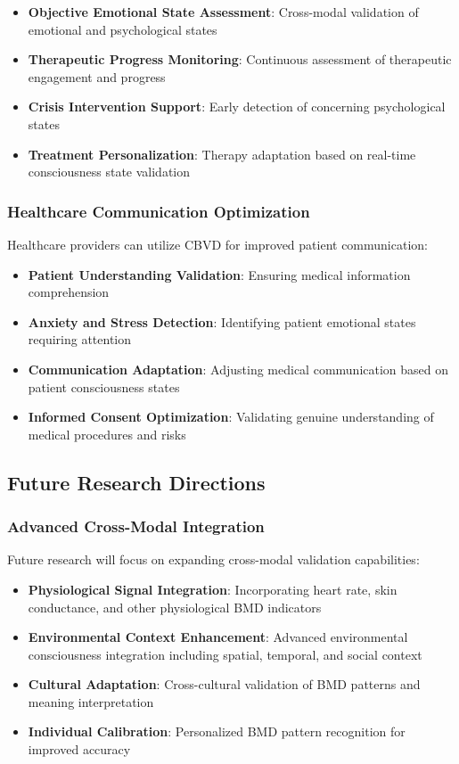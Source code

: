 \documentclass[12pt,a4paper]{article}
\begin{document}
\begin{itemize}
\item \textbf{Objective Emotional State Assessment}: Cross-modal validation of emotional and psychological states
\item \textbf{Therapeutic Progress Monitoring}: Continuous assessment of therapeutic engagement and progress
\item \textbf{Crisis Intervention Support}: Early detection of concerning psychological states
\item \textbf{Treatment Personalization}: Therapy adaptation based on real-time consciousness state validation
\end{itemize}

\subsubsection{Healthcare Communication Optimization}

Healthcare providers can utilize CBVD for improved patient communication:

\begin{itemize}
\item \textbf{Patient Understanding Validation}: Ensuring medical information comprehension
\item \textbf{Anxiety and Stress Detection}: Identifying patient emotional states requiring attention
\item \textbf{Communication Adaptation}: Adjusting medical communication based on patient consciousness states
\item \textbf{Informed Consent Optimization}: Validating genuine understanding of medical procedures and risks
\end{itemize}

\subsection{Future Research Directions}

\subsubsection{Advanced Cross-Modal Integration}

Future research will focus on expanding cross-modal validation capabilities:

\begin{itemize}
\item \textbf{Physiological Signal Integration}: Incorporating heart rate, skin conductance, and other physiological BMD indicators
\item \textbf{Environmental Context Enhancement}: Advanced environmental consciousness integration including spatial, temporal, and social context
\item \textbf{Cultural Adaptation}: Cross-cultural validation of BMD patterns and meaning interpretation
\item \textbf{Individual Calibration}: Personalized BMD pattern recognition for improved accuracy
\end{itemize}
\end{document}
